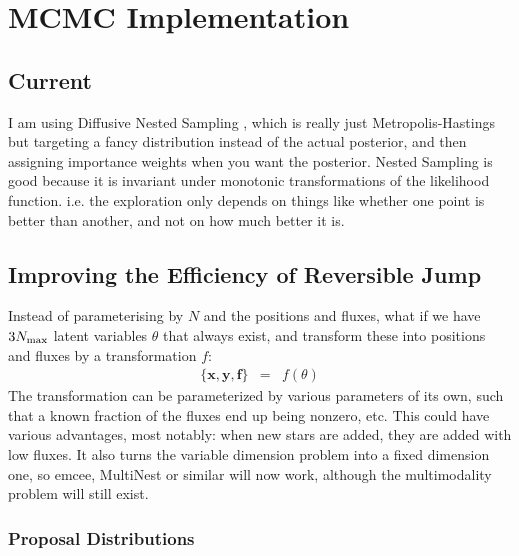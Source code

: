 \documentclass[letterpaper, 11pt]{article}
\begin{document}
\section{MCMC Implementation}
\subsection{Current}
I am using Diffusive Nested Sampling \citep{dnest}, which is really just
Metropolis-Hastings but targeting a fancy distribution instead of the actual
posterior, and then assigning importance weights when you want the posterior.
Nested Sampling is good because it is invariant under monotonic transformations
of the likelihood function. i.e. the exploration only depends on things like
whether one point is better than another, and not on how much better it is.

\subsection{Improving the Efficiency of Reversible Jump}
Instead of parameterising by $N$ and the positions and fluxes, what if we have
$3N_{\rm max}$ latent variables $\theta$ that always exist, and transform these
into
positions and fluxes by a transformation $f$:
\begin{eqnarray}
\{\mathbf{x}, \mathbf{y}, \mathbf{f}\} &=& f(\theta)
\end{eqnarray}
The transformation can be parameterized by various parameters of its own, such
that a known fraction of the fluxes end up being nonzero, etc. This could have
various advantages, most notably: when new stars are added, they are added with
low fluxes. It also turns the variable dimension problem into a fixed dimension
one, so emcee, MultiNest or similar will now work, although the multimodality problem will
still exist.

\subsubsection{Proposal Distributions}
\end{document}
